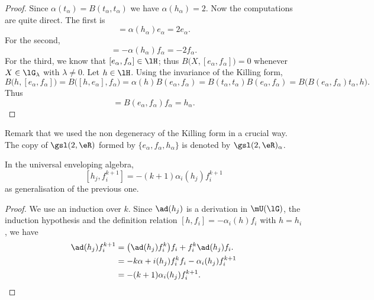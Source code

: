 \begin{proof}
    Since \( \alpha(t_{\alpha})=B(t_{\alpha},t_{\alpha})\) we have \( \alpha(h_{\alpha})=2\). Now the computations are quite direct. The first is
    \begin{equation}
        [h_{\alpha},e_{\alpha}]=\alpha(h_{\alpha})e_{\alpha}=2e_{\alpha}.
    \end{equation}
    For the second,
    \begin{equation}
        [h_{\alpha},f_{\alpha}]=-\alpha(h_{\alpha})f_{\alpha}=-2f_{\alpha}.
    \end{equation}
    For the third, we know that \( [e_{\alpha},f_{\alpha}]\in\lH\); thus \( B\big( X,[e_{\alpha},f_{\alpha}] \big)=0\) whenever \( X\in\lG_{\lambda}\) with \( \lambda\neq 0\). Let \( h\in\lH\). Using the invariance of the Killing form,
    \begin{equation}
        B\big( h,[e_{\alpha},f_{\alpha}] \big)=B\big( [h,e_{\alpha}],f_{\alpha} \big)=\alpha(h)B(e_{\alpha},f_{\alpha})=B(t_{\alpha},t_{\alpha})B(e_{\alpha},f_{\alpha})=B\big( B(e_{\alpha},f_{\alpha})t_{\alpha},h \big).
    \end{equation}
    Thus
    \begin{equation}
        [e_{\alpha},f_{\alpha}]=B(e_{\alpha},f_{\alpha})f_{\alpha}=h_{\alpha}.
    \end{equation}
\end{proof}
Remark that we used the non degeneracy of the Killing form in a crucial way. The copy of \( \gsl(2,\eR)\) formed by \( \{ e_{\alpha},f_{\alpha},h_{\alpha} \}\) is denoted by $\gsl(2,\eR)_{\alpha}$.

\begin{proposition}
    In the universal enveloping algebra,
    \begin{equation}        \label{Eqhjfikplusun}
        [h_j,f_i^{k+1}]=-(k+1)\alpha_i(h_j)f_i^{k+1}
    \end{equation}
    as generalisation of the previous one.
\end{proposition}

\begin{proof}
    We use an induction over $k$. Since $\ad(h_j)$ is a derivation in $\mU(\lG)$, the induction hypothesis and the definition relation $[h,f_i]=-\alpha_i(h)f_i$ with $h=h_i$, we have
    \begin{equation}
        \begin{split}
            \ad(h_j)f^{k+1}_i   &=\big( \ad(h_j)f_i^k \big)f_i+f_i^k\ad(h_j)f_i.\\
                        &=-k\alpha+i(h_j)f_i^kf_i-\alpha_i(h_j)f^{k+1}_i\\
                        &=-(k+1)\alpha_i(h_j)f_i^{k+1}.
        \end{split}
    \end{equation}
\end{proof}

